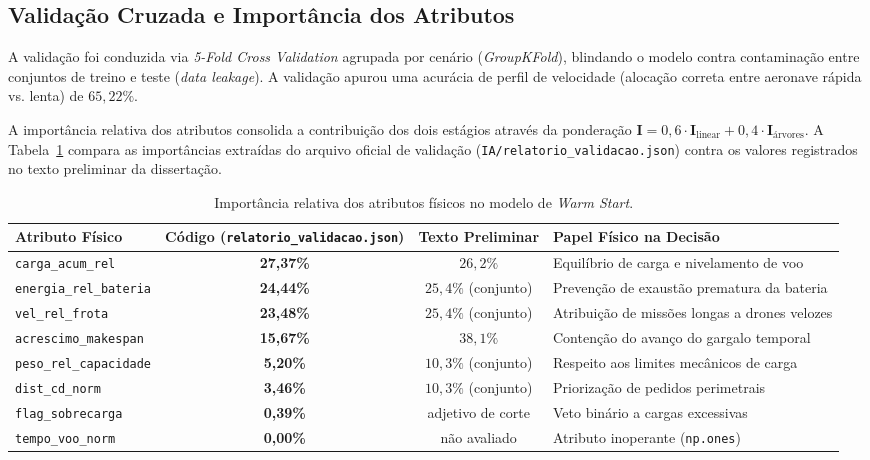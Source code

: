 \subsection{Validação Cruzada e Importância dos Atributos}

A validação foi conduzida via \textit{5-Fold Cross Validation} agrupada por cenário (\textit{GroupKFold}), blindando o modelo contra contaminação entre conjuntos de treino e teste (\textit{data leakage}). A validação apurou uma acurácia de perfil de velocidade (alocação correta entre aeronave rápida vs. lenta) de $65{,}22\%$.

A importância relativa dos atributos consolida a contribuição dos dois estágios através da ponderação $\mathbf{I} = 0{,}6 \cdot \mathbf{I}_{\text{linear}} + 0{,}4 \cdot \mathbf{I}_{\text{árvores}}$. A Tabela~\ref{tab:importancia_features} compara as importâncias extraídas do arquivo oficial de validação (\texttt{IA/relatorio\_validacao.json}) contra os valores registrados no texto preliminar da dissertação.

\begin{table}[htbp]
\centering
\small
\caption{Importância relativa dos atributos físicos no modelo de \textit{Warm Start}.}\label{tab:importancia_features}
\begin{tabular}{l c c l}
\toprule
\textbf{Atributo Físico} & \textbf{Código (\texttt{relatorio\_validacao.json})} & \textbf{Texto Preliminar} & \textbf{Papel Físico na Decisão} \\
\midrule
\texttt{carga\_acum\_rel} & \textbf{27,37\%} & $26{,}2\%$ & Equilíbrio de carga e nivelamento de voo \\
\texttt{energia\_rel\_bateria} & \textbf{24,44\%} & $25{,}4\%$ (conjunto) & Prevenção de exaustão prematura da bateria \\
\texttt{vel\_rel\_frota} & \textbf{23,48\%} & $25{,}4\%$ (conjunto) & Atribuição de missões longas a drones velozes \\
\texttt{acrescimo\_makespan} & \textbf{15,67\%} & $38{,}1\%$ & Contenção do avanço do gargalo temporal \\
\texttt{peso\_rel\_capacidade} & \textbf{5,20\%} & $10{,}3\%$ (conjunto) & Respeito aos limites mecânicos de carga \\
\texttt{dist\_cd\_norm} & \textbf{3,46\%} & $10{,}3\%$ (conjunto) & Priorização de pedidos perimetrais \\
\texttt{flag\_sobrecarga} & \textbf{0,39\%} & adjetivo de corte & Veto binário a cargas excessivas \\
\texttt{tempo\_voo\_norm} & \textbf{0,00\%} & não avaliado & Atributo inoperante (\texttt{np.ones}) \\
\bottomrule
\end{tabular}
\end{table}

